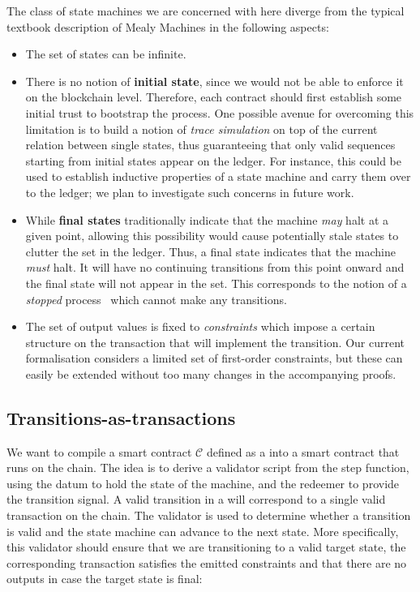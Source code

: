 The class of state machines we are concerned with here diverge from
the typical textbook description of Mealy Machines in the following aspects:
\begin{itemize}
\item The set of states can be infinite.

\item There is no notion of \textbf{initial state}, since we would not
  be able to enforce it on the blockchain level. Therefore, each
  contract should first establish some initial trust to bootstrap the
  process.
  One possible avenue for overcoming this limitation is to build a notion of \textit{trace simulation}
  on top of the current relation between single states,
  thus guaranteeing that only valid sequences starting from initial states appear on the ledger.
  For instance, this could be used to establish inductive properties of a state machine and
  carry them over to the ledger; we plan to investigate such concerns in future work.

\item While \textbf{final states} traditionally indicate that the
  machine \textit{may} halt at a given point, allowing this
  possibility would cause potentially stale states to clutter the \UTXO{}
  set in the ledger. Thus, a \CEM{} final state indicates that the
  machine \textit{must} halt. It will have no continuing transitions
  from this point onward and the final state will not appear in the
  \UTXO{} set. This corresponds to the notion of a \emph{stopped}
  process~\cite{sangiorgi} which cannot make any transitions.

\item The set of output values is fixed to \emph{constraints} which
  impose a certain structure on the transaction that will implement
  the transition.  Our current formalisation considers a limited set
  of first-order constraints, but these can easily be extended without
  too many changes in the accompanying proofs.
\end{itemize}

\subsection{Transitions-as-transactions}

We want to compile a smart contract $\mathcal{C}$ defined as a \CEM{} into
a smart contract that runs on the chain. The idea is to derive a
validator script from the step function, using the datum to hold the
state of the machine, and the redeemer to provide the transition signal.
A valid transition in a \CEM{}
will correspond to a single valid transaction on the chain. The
validator is used to determine whether a transition is valid and the
state machine can advance to the next state. More specifically, this
validator should ensure that we are transitioning to a valid target
state, the corresponding transaction satisfies the emitted constraints
and that there are no outputs in case the target state is final:


